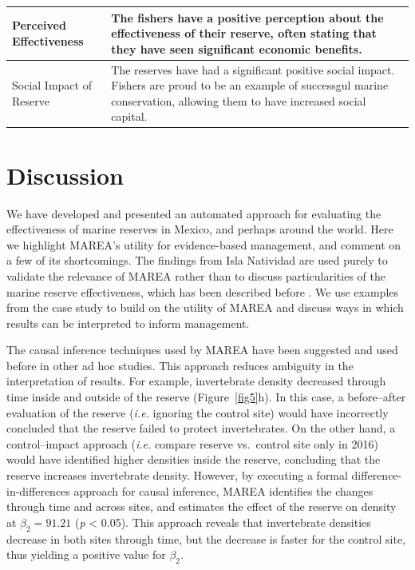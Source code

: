 \documentclass[10pt,letterpaper]{article}
\begin{document}
\begin{table}[!ht]
\begin{adjustwidth}{-2.25in}{0in}
\begin{tabular}{l|>{\raggedright\arraybackslash}p{9cm}}
\hline
Perceived Effectiveness & The fishers have a positive perception about the effectiveness of their reserve, often stating that they have seen significant economic benefits.\\
\hline
Social Impact of Reserve & The reserves have had a significant positive social impact. Fishers are proud to be an example of successgul marine conservation, allowing them to have increased social capital.\\
\hline
\end{tabular}
\label{table5}
\end{adjustwidth}
\end{table}

\section*{Discussion}\label{discussion}

We have developed and presented an automated approach for evaluating the effectiveness of marine reserves in Mexico, and perhaps around the world. Here we highlight MAREA's utility for evidence-based management, and comment on a few of its shortcomings. The findings from Isla Natividad are used purely to validate the relevance of MAREA rather than to discuss particularities of the marine reserve effectiveness, which has been described before \cite{micheli_2012-EU,rossetto_2015-V0,munguavega_2015-yg}. We use examples from the case study to build on the utility of MAREA and discuss ways in which results can be interpreted to inform management.

The causal inference techniques used by MAREA have been suggested \cite{burgess_2018-HN,ferraro_2006-oW} and used \cite{moland_2013-VP} before in other ad hoc studies. This approach reduces ambiguity in the interpretation of results. For example, invertebrate density decreased through time inside and outside of the reserve (Figure~\ref{fig5}h). In this case, a before--after evaluation of the reserve (\emph{i.e.} ignoring the control site) would have incorrectly concluded that the reserve failed to protect invertebrates. On the other hand, a control--impact approach (\emph{i.e.} compare reserve vs.~control site only in 2016) would have identified higher densities inside the reserve, concluding that the reserve increases invertebrate density. However, by executing a formal difference-in-differences approach for causal inference, MAREA identifies the changes through time and across sites, and estimates the effect of the reserve on density at \(\beta_2 = 91.21\) (\emph{p} \textless{} 0.05). This approach reveals that invertebrate densities decrease in both sites through time, but the decrease is faster for the control site, thus yielding a positive value for \(\beta_2\).
\end{document}
